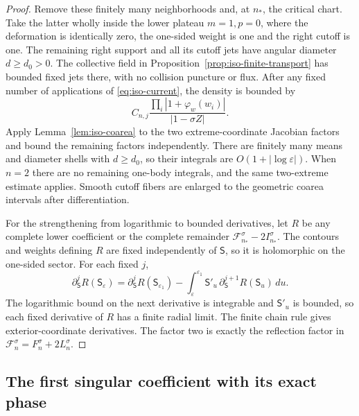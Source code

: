 \documentclass[11pt]{article}
\numberwithin{equation}{section}
\theoremstyle{definition}
\newcommand{\eps}{\varepsilon}
\begin{document}
\begin{proof}
Remove these finitely many neighborhoods and, at $n_*$, the critical
chart.  Take the latter wholly inside the lower plateau $m=1,p=0$,
where the deformation is identically zero, the one-sided weight is
one and the right cutoff is one.  The remaining right support and
all its cutoff jets have angular diameter $d\ge d_0>0$.
The collective field in Proposition~\ref{prop:iso-finite-transport}
has bounded fixed jets there, with no collision puncture or flux.
After any fixed number of applications of \eqref{eq:iso-current},
the density is bounded by
\[
 C_{n,j}\frac{\prod_i|1+\varphi_w(w_i)|}{|1-\sigma Z|}.
\]
Apply Lemma~\ref{lem:iso-coarea} to the two extreme-coordinate
Jacobian factors and bound the remaining factors independently.
There are finitely many means and diameter shells with $d\ge d_0$,
so their integrals are $O(1+|\log\eps|)$.  When $n=2$ there are
no remaining one-body integrals, and the same two-extreme estimate
applies.  Smooth cutoff fibers are enlarged to the geometric
coarea intervals after differentiation.

For the strengthening from logarithmic to bounded derivatives, let
$R$ be any complete lower coefficient or the complete remainder
$\mathcal F_{n_*}^\sigma-2I_{n_*}^\sigma$.
The contours and weights defining $R$ are fixed independently of
$\mathsf S$, so it is holomorphic on the one-sided sector.  For each
fixed $j$,
\[
 \partial_{\mathsf S}^{j}R(\mathsf S_\eps)
 =\partial_{\mathsf S}^{j}R(\mathsf S_{\eps_1})
  -\int_\eps^{\eps_1}
      \mathsf S'_u\,
      \partial_{\mathsf S}^{j+1}R(\mathsf S_u)\,du.
\]
The logarithmic bound on the next derivative is integrable and
$\mathsf S'_u$ is bounded, so each fixed derivative of $R$ has
a finite radial limit.
The finite chain rule gives exterior-coordinate derivatives.
The factor two is exactly the reflection factor in
$\mathcal F_n^\sigma=F_n^\sigma+2L_n^\sigma$.
\end{proof}

\subsection{The first singular coefficient with its exact phase}
\end{document}
